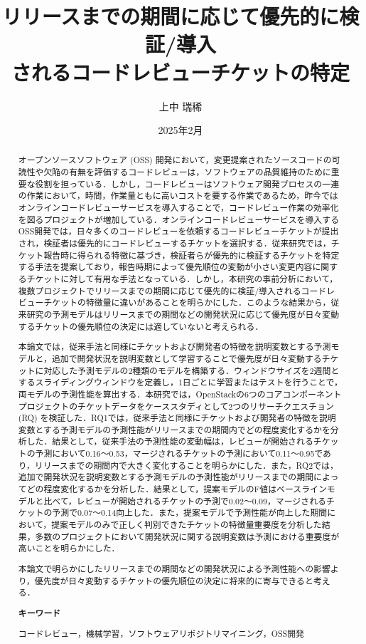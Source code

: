 \documentclass[11pt]{jreport}
\title{リリースまでの期間に応じて優先的に検証/導入\\されるコードレビューチケットの特定}
\author{上中 瑞稀}
\date{2025年2月}	%
\begin{document}
\maketitle

\begin{abstract}
オープンソースソフトウェア (OSS) 開発において，変更提案されたソースコードの可読性や欠陥の有無を評価するコードレビューは，ソフトウェアの品質維持のために重要な役割を担っている．しかし，コードレビューはソフトウェア開発プロセスの一連の作業において，時間，作業量ともに高いコストを要する作業であるため，昨今ではオンラインコードレビューサービスを導入することで，コードレビュー作業の効率化を図るプロジェクトが増加している．オンラインコードレビューサービスを導入するOSS開発では，日々多くのコードレビューを依頼するコードレビューチケットが提出され，検証者は優先的にコードレビューするチケットを選択する．従来研究では，チケット報告時に得られる特徴に基づき，検証者らが優先的に検証するチケットを特定する手法を提案しており，報告時期によって優先順位の変動が小さい変更内容に関するチケットに対して有用な手法となっている．しかし，本研究の事前分析において，複数プロジェクトでリリースまでの期間に応じて優先的に検証/導入されるコードレビューチケットの特徴量に違いがあることを明らかにした．このような結果から，従来研究の予測モデルはリリースまでの期間などの開発状況に応じて優先度が日々変動するチケットの優先順位の決定には適していないと考えられる．

本論文では，従来手法と同様にチケットおよび開発者の特徴を説明変数とする予測モデルと，追加で開発状況を説明変数として学習することで優先度が日々変動するチケットに対応した予測モデルの2種類のモデルを構築する．ウィンドウサイズを2週間とするスライディングウィンドウを定義し，1日ごとに学習またはテストを行うことで，両モデルの予測性能を算出する．本研究では，OpenStackの6つのコアコンポーネントプロジェクトのチケットデータをケーススタディとして2つのリサーチクエスチョン (RQ) を検証した．RQ1では，従来手法と同様にチケットおよび開発者の特徴を説明変数とする予測モデルの予測性能がリリースまでの期間内でどの程度変化するかを分析した．結果として，従来手法の予測性能の変動幅は，レビューが開始されるチケットの予測において0.16〜0.53，マージされるチケットの予測において0.11〜0.95であり，リリースまでの期間内で大きく変化することを明らかにした．また，RQ2では，追加で開発状況を説明変数とする予測モデルの予測性能がリリースまでの期間によってどの程度変化するかを分析した．結果として，提案モデルのF値はベースラインモデルと比べて，レビューが開始されるチケットの予測で0.02〜0.09，マージされるチケットの予測で0.07〜0.14向上した．また，提案モデルで予測性能が向上した期間において，提案モデルのみで正しく判別できたチケットの特徴量重要度を分析した結果，多数のプロジェクトにおいて開発状況に関する説明変数は予測における重要度が高いことを明らかにした．

本論文で明らかにしたリリースまでの期間などの開発状況による予測性能への影響より，優先度が日々変動するチケットの優先順位の決定に将来的に寄与できると考える．



\textbf{キーワード}

コードレビュー，機械学習，ソフトウェアリポジトリマイニング，OSS開発

\end{abstract}
\end{document}
